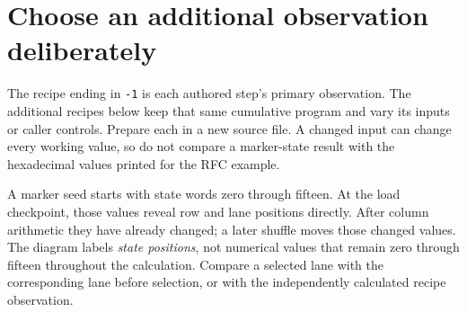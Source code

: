\section{Choose an additional observation deliberately}
The recipe ending in \texttt{-1} is each authored step's primary observation.
The additional recipes below keep that same cumulative program and vary its inputs
or caller controls. Prepare each in a new source file. A changed input can change
every working value, so do not compare a marker-state result with the hexadecimal
values printed for the RFC example.

A marker seed starts with state words zero through fifteen. At the load checkpoint,
those values reveal row and lane positions directly. After column arithmetic they
have already changed; a later shuffle moves those changed values. The diagram labels
\emph{state positions}, not numerical values that remain zero through fifteen
throughout the calculation. Compare a selected lane with the corresponding lane
before selection, or with the independently calculated recipe observation.

